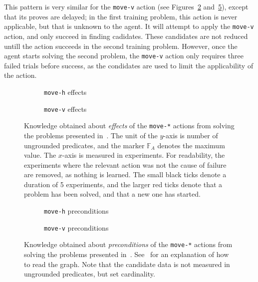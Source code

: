 \documentclass[../Master.tex]{subfiles}
\providecommand{\master}{..}
\begin{document}
This pattern is very similar for the \texttt{move-v} action (see Figures~\ref{fig:res:ekmovev} and~\ref{fig:res:pkmovev}), except that its proves are delayed; in the first training problem, this action is never applicable, but that is unknown to the agent. It will attempt to apply the \texttt{move-v} action, and only succeed in finding cadidates. These candidates are not reduced untill the action succeeds in the second training problem. However, once the agent starts solving the second problem, the \texttt{move-v} action only requires three failed trials before success, as the condidates are used to limit the applicability of the action.

\begin{figure}
    \centering
    \begin{subfigure}{0.45\linewidth}
        \resizebox{\linewidth}{!}{}
        \caption{\texttt{move-h} effects}\label{fig:res:ekmoveh}
    \end{subfigure}
    \begin{subfigure}{0.45\linewidth}
        \resizebox{\linewidth}{!}{}
        \caption{\texttt{move-v} effects}\label{fig:res:ekmovev}
    \end{subfigure}
    \caption{Knowledge obtained about \emph{effects} of the \texttt{move-*} actions from solving the problems presented in~. The unit of the $y$-axis is number of ungrounded predicates, and the marker $\mathbb{F}_A$ denotes the maximum value. The $x$-axis is measured in experiments. For readability, the experiments where the relevant action was not the cause of failure are removed, as nothing is learned. The small black ticks denote a duration of 5 experiments, and the larger red ticks denote that a problem has been solved, and that a new one has started.}\label{fig:res:ekmove}
\end{figure}

\begin{figure}
    \centering
    \begin{subfigure}{0.42\linewidth}
        \resizebox{\linewidth}{!}{}
        \caption{\texttt{move-h} preconditions}\label{fig:res:pkmoveh}
    \end{subfigure}
    \begin{subfigure}{0.42\linewidth}
        \resizebox{\linewidth}{!}{}
        \caption{\texttt{move-v} preconditions}\label{fig:res:pkmovev}
    \end{subfigure}
    \caption{Knowledge obtained about \emph{preconditions} of the \texttt{move-*} actions from solving the problems presented in~. See~ for an explanation of how to read the graph. Note that the candidate data is not measured in ungrounded predicates, but set cardinality.}\label{fig:res:pkmove}
\end{figure}
\end{document}
